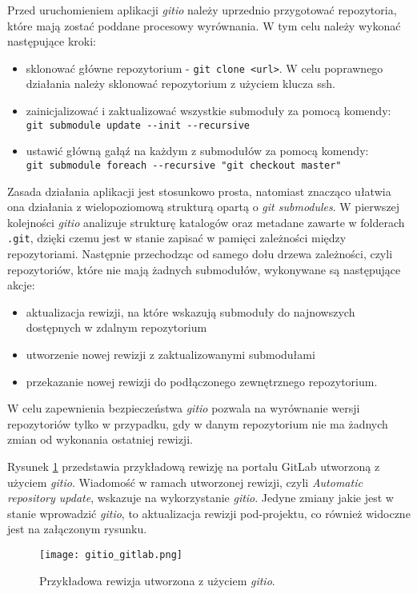 Przed uruchomieniem aplikacji \emph{gitio} należy uprzednio przygotować repozytoria, które mają zostać poddane procesowy wyrównania. W tym celu należy wykonać następujące kroki:
\begin{itemize}
    \item sklonować główne repozytorium - \lstinline{git clone <url>}. W celu poprawnego działania należy sklonować repozytorium z użyciem klucza ssh.
    \item zainicjalizować i zaktualizować wszystkie submoduły za pomocą komendy: \\
        \lstinline{git submodule update --init --recursive}
    \item ustawić główną gałąź na każdym z submodułów za pomocą komendy: \\
        \lstinline{git submodule foreach --recursive "git checkout master"}
\end{itemize}
Zasada działania aplikacji jest stosunkowo prosta, natomiast znacząco ułatwia ona działania z wielopoziomową strukturą opartą o \emph{git submodules}. W pierwszej kolejności \emph{gitio} analizuje strukturę katalogów oraz metadane zawarte w folderach \lstinline{.git}, dzięki czemu jest w stanie zapisać w pamięci zależności między repozytoriami. Następnie przechodząc od samego dołu drzewa zależności, czyli repozytoriów, które nie mają żadnych submodułów, wykonywane są następujące akcje:
\begin{itemize}
    \item aktualizacja rewizji, na które wskazują submoduły do najnowszych dostępnych w zdalnym repozytorium
    \item utworzenie nowej rewizji z zaktualizowanymi submodułami
    \item przekazanie nowej rewizji do podłączonego zewnętrznego repozytorium.
\end{itemize}
W celu zapewnienia bezpieczeństwa \emph{gitio} pozwala na wyrównanie wersji repozytoriów tylko w przypadku, gdy w danym repozytorium nie ma żadnych zmian od wykonania ostatniej rewizji. 

Rysunek \ref{fig:gitlab_gitio} przedstawia przykładową rewizję na portalu GitLab utworzoną z użyciem \emph{gitio}. Wiadomość w ramach utworzonej rewizji, czyli \emph{Automatic repository update}, wskazuje na wykorzystanie \emph{gitio}. Jedyne zmiany jakie jest w stanie wprowadzić \emph{gitio}, to aktualizacja rewizji pod-projektu, co również widoczne jest na załączonym rysunku.

\begin{figure}[H]
    \centering
    \texttt{[image: gitio\_gitlab.png]}
    \caption{Przykładowa rewizja utworzona z użyciem \emph{gitio}.}
    \label{fig:gitlab_gitio}
\end{figure}


